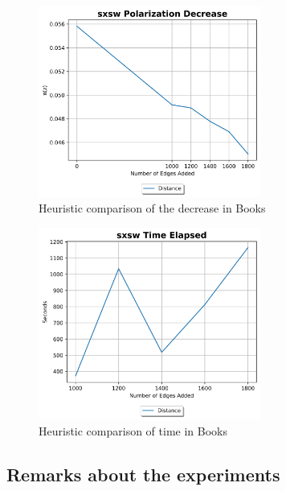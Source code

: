 \clearpage

\begin{figure}[H]
	\centering
	\includegraphics[width=0.65\textwidth]{Figures/sxsw Polarization Decrease 2}
	\caption{Heuristic comparison of the decrease in Books}
	\label{fig:sxsw_pol}
\end{figure}


\begin{figure}[H]
	\centering
	\includegraphics[width=0.65\textwidth]{Figures/sxsw Time Elapsed 2}
	\caption{Heuristic comparison of time in Books}
	\label{fig:sxsw_time}
\end{figure}

\clearpage

\subsection{Remarks about the experiments}


